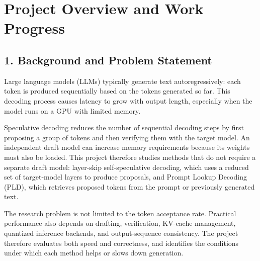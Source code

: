 \chapter*{Project Overview and Work Progress}

\section*{1. Background and Problem Statement}
Large language models (LLMs) typically generate text autoregressively: each token is produced sequentially based on the tokens generated so far. This decoding process causes latency to grow with output length, especially when the model runs on a GPU with limited memory.

Speculative decoding reduces the number of sequential decoding steps by first proposing a group of tokens and then verifying them with the target model. An independent draft model can increase memory requirements because its weights must also be loaded. This project therefore studies methods that do not require a separate draft model: layer-skip self-speculative decoding, which uses a reduced set of target-model layers to produce proposals, and Prompt Lookup Decoding (PLD), which retrieves proposed tokens from the prompt or previously generated text.

The research problem is not limited to the token acceptance rate. Practical performance also depends on drafting, verification, KV-cache management, quantized inference backends, and output-sequence consistency. The project therefore evaluates both speed and correctness, and identifies the conditions under which each method helps or slows down generation.

